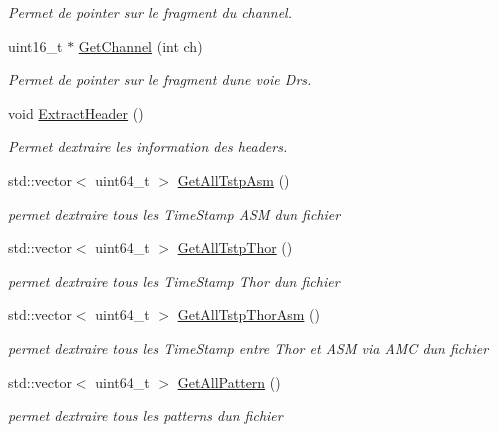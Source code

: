 \begin{DoxyCompactItemize}
\begin{DoxyCompactList}\small\item\em Permet de pointer sur le fragment du channel. \end{DoxyCompactList}\item 
uint16\+\_\+t $\ast$ \hyperlink{class_decode_frame_a7f74abf3aa3facf17363ce6b643700c5}{Get\+Channel} (int ch)
\begin{DoxyCompactList}\small\item\em Permet de pointer sur le fragment d\textquotesingle{}une voie Drs. \end{DoxyCompactList}\item 
void \hyperlink{class_decode_frame_a7d3cb26d923ec22430687186a002c1a8}{Extract\+Header} ()
\begin{DoxyCompactList}\small\item\em Permet d\textquotesingle{}extraire les information des headers. \end{DoxyCompactList}\item 
std\+::vector$<$ uint64\+\_\+t $>$ \hyperlink{class_decode_frame_a0b3030ee5fcf599dfc15efa03b007a2d}{Get\+All\+Tstp\+Asm} ()
\begin{DoxyCompactList}\small\item\em permet d\textquotesingle{}extraire tous les Time\+Stamp A\+SM d\textquotesingle{}un fichier \end{DoxyCompactList}\item 
std\+::vector$<$ uint64\+\_\+t $>$ \hyperlink{class_decode_frame_aaf768149c11e4f8393af44b73c0163c9}{Get\+All\+Tstp\+Thor} ()
\begin{DoxyCompactList}\small\item\em permet d\textquotesingle{}extraire tous les Time\+Stamp Thor d\textquotesingle{}un fichier \end{DoxyCompactList}\item 
std\+::vector$<$ uint64\+\_\+t $>$ \hyperlink{class_decode_frame_a93dc46d04d8ccfbb75284dfaf72b5b25}{Get\+All\+Tstp\+Thor\+Asm} ()
\begin{DoxyCompactList}\small\item\em permet d\textquotesingle{}extraire tous les Time\+Stamp entre Thor et A\+SM via A\+MC d\textquotesingle{}un fichier \end{DoxyCompactList}\item 
std\+::vector$<$ uint64\+\_\+t $>$ \hyperlink{class_decode_frame_a86005f4e7d6746978adc98b07e444d1c}{Get\+All\+Pattern} ()
\begin{DoxyCompactList}\small\item\em permet d\textquotesingle{}extraire tous les patterns d\textquotesingle{}un fichier \end{DoxyCompactList}\item 

\end{DoxyCompactItemize}

